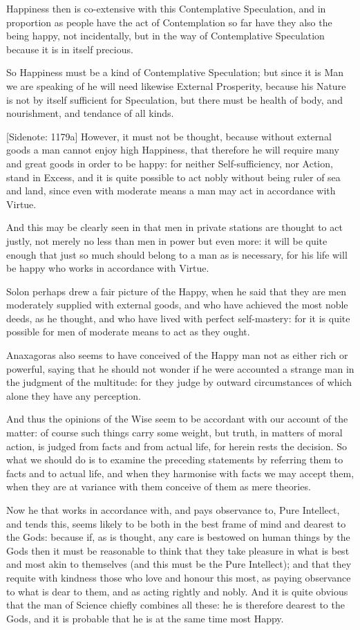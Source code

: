 Happiness then is co-extensive with this Contemplative Speculation, and
in proportion as people have the act of Contemplation so far have they
also the being happy, not incidentally, but in the way of Contemplative
Speculation because it is in itself precious.

So Happiness must be a kind of Contemplative Speculation; but since it
is Man we are speaking of he will need likewise External Prosperity,
because his Nature is not by itself sufficient for Speculation, but
there must be health of body, and nourishment, and tendance of all
kinds.

[Sidenote: 1179a] However, it must not be thought, because without
external goods a man cannot enjoy high Happiness, that therefore he
will require many and great goods in order to be happy: for neither
Self-sufficiency, nor Action, stand in Excess, and it is quite possible
to act nobly without being ruler of sea and land, since even with
moderate means a man may act in accordance with Virtue.

And this may be clearly seen in that men in private stations are thought
to act justly, not merely no less than men in power but even more: it
will be quite enough that just so much should belong to a man as is
necessary, for his life will be happy who works in accordance with
Virtue.

Solon perhaps drew a fair picture of the Happy, when he said that they
are men moderately supplied with external goods, and who have achieved
the most noble deeds, as he thought, and who have lived with perfect
self-mastery: for it is quite possible for men of moderate means to act
as they ought.

Anaxagoras also seems to have conceived of the Happy man not as either
rich or powerful, saying that he should not wonder if he were accounted
a strange man in the judgment of the multitude: for they judge by
outward circumstances of which alone they have any perception.

And thus the opinions of the Wise seem to be accordant with our account
of the matter: of course such things carry some weight, but truth, in
matters of moral action, is judged from facts and from actual life,
for herein rests the decision. So what we should do is to examine the
preceding statements by referring them to facts and to actual life, and
when they harmonise with facts we may accept them, when they are at
variance with them conceive of them as mere theories.

Now he that works in accordance with, and pays observance to, Pure
Intellect, and tends this, seems likely to be both in the best frame of
mind and dearest to the Gods: because if, as is thought, any care is
bestowed on human things by the Gods then it must be reasonable to think
that they take pleasure in what is best and most akin to themselves (and
this must be the Pure Intellect); and that they requite with kindness
those who love and honour this most, as paying observance to what is
dear to them, and as acting rightly and nobly. And it is quite obvious
that the man of Science chiefly combines all these: he is therefore
dearest to the Gods, and it is probable that he is at the same time most
Happy.

